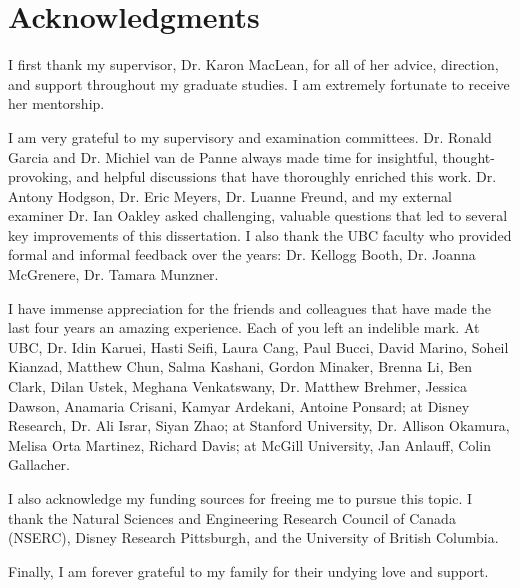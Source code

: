 
\chapter{Acknowledgments}

I first thank my supervisor, Dr. Karon MacLean, for all of her advice, direction, and support throughout my graduate studies.
I am extremely fortunate to receive her mentorship.

I am very grateful to my supervisory and examination committees. Dr. Ronald Garcia and Dr. Michiel van de Panne always made time for insightful, thought-provoking, and helpful discussions that have thoroughly enriched this work.
Dr. Antony Hodgson, Dr. Eric Meyers, Dr. Luanne Freund, and my external examiner Dr. Ian Oakley asked challenging, valuable questions that led to several key improvements of this dissertation.
I also thank the UBC faculty who provided formal and informal feedback over the years: Dr. Kellogg Booth, Dr. Joanna McGrenere, Dr. Tamara Munzner.

I have immense appreciation for the friends and colleagues that have made the last four years an amazing experience.
Each of you left an indelible mark.
At UBC, Dr. Idin Karuei, Hasti Seifi, Laura Cang, Paul Bucci,  David Marino, Soheil Kianzad, Matthew Chun, Salma Kashani, Gordon Minaker, Brenna Li,  Ben Clark, Dilan Ustek, Meghana Venkatswany, Dr. Matthew Brehmer, Jessica Dawson, Anamaria Crisani, Kamyar Ardekani, Antoine Ponsard;
at Disney Research, Dr. Ali Israr, Siyan Zhao; 
at Stanford University, Dr. Allison Okamura, Melisa Orta Martinez, Richard Davis;
at McGill University, Jan Anlauff, Colin Gallacher.

I also acknowledge my funding sources for freeing me to pursue this topic.
I thank the Natural Sciences and Engineering Research Council of Canada (NSERC), Disney Research Pittsburgh, and the University of British Columbia.

Finally, I am forever grateful to my family for their undying love and support.
